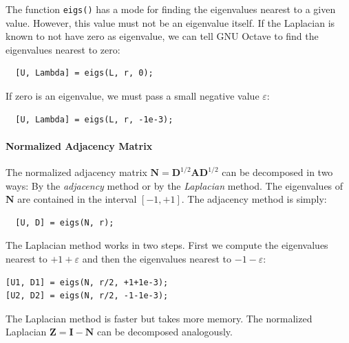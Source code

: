 \documentclass[11pt,a4paper]{book}
\newenvironment{mylisting}{\begin{list}{}{\setlength{\leftmargin}{1em}}\item\small\bfseries}{\end{list}}
\begin{document}
The function \texttt{eigs()} has a mode for finding the eigenvalues
nearest to a given value.  However, this value must not be an eigenvalue
itself.
If the Laplacian is known to not have zero as eigenvalue, we can tell
GNU Octave to find the eigenvalues nearest to zero:

\begin{mylisting}
\begin{verbatim}
  [U, Lambda] = eigs(L, r, 0); 
\end{verbatim}
\end{mylisting}

If zero is an eigenvalue, we must pass a small negative value $\varepsilon$:

\begin{mylisting}
\begin{verbatim}
  [U, Lambda] = eigs(L, r, -1e-3); 
\end{verbatim}
\end{mylisting}

\paragraph{Normalized Adjacency Matrix}
The normalized adjacency matrix $\mathbf N = \mathbf D^{1/2}\mathbf A
\mathbf D^{1/2}$ can be decomposed in two ways:  By the \emph{adjacency}
method or by the \emph{Laplacian} method.  The eigenvalues of $\mathbf N$
are contained in the interval $[-1, +1]$. 
The adjacency method is simply: 

\begin{mylisting}
\begin{verbatim}
  [U, D] = eigs(N, r); 
\end{verbatim}
\end{mylisting}

The Laplacian method works in two steps.  First we compute the
eigenvalues nearest to $+1+\varepsilon$ and then the eigenvalues nearest to
$-1-\varepsilon$: 

\begin{mylisting}
\begin{verbatim}
[U1, D1] = eigs(N, r/2, +1+1e-3); 
[U2, D2] = eigs(N, r/2, -1-1e-3); 
\end{verbatim}
\end{mylisting}

The Laplacian method is faster but takes more memory.  The normalized
Laplacian $\mathbf Z = \mathbf I - \mathbf N$ can be decomposed
analogously. 

\backmatter
{}
\end{document}
